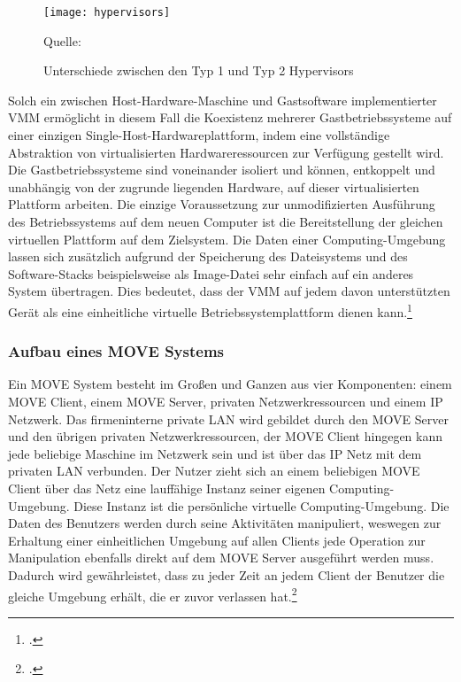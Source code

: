 \begin{figure}[H]
\begin{center}
\texttt{[image: hypervisors]}
\caption{Unterschiede zwischen den Typ 1 und Typ 2 Hypervisors}
Quelle: \cite[]{ibm}
\end{center}
\end{figure}
\vspace{-1cm}

Solch ein zwischen Host-Hardware-Maschine und Gastsoftware implementierter VMM ermöglicht in diesem Fall die Koexistenz mehrerer Gastbetriebssysteme auf einer einzigen Single-Host-Hardwareplattform, indem eine vollständige Abstraktion von virtualisierten Hardwareressourcen zur Verfügung gestellt wird. Die Gastbetriebssysteme sind voneinander isoliert und können, entkoppelt und unabhängig von der zugrunde liegenden Hardware, auf dieser virtualisierten Plattform arbeiten. Die einzige Voraussetzung zur unmodifizierten Ausführung des Betriebssystems auf dem neuen Computer ist die Bereitstellung der gleichen virtuellen Plattform auf dem Zielsystem. Die Daten einer Computing-Umgebung lassen sich zusätzlich aufgrund der Speicherung des Dateisystems und des Software-Stacks beispielsweise als Image-Datei sehr einfach auf ein anderes System übertragen. Dies bedeutet, dass der VMM auf jedem davon unterstützten Gerät als eine einheitliche virtuelle Betriebssystemplattform dienen kann.\footcite[Vgl.][Seite 891]{MOVE}

\subsubsection{Aufbau eines MOVE Systems}
Ein MOVE System besteht im Großen und Ganzen aus vier Komponenten: einem MOVE Client, einem MOVE Server, privaten Netzwerkressourcen und einem IP Netzwerk. Das firmeninterne private LAN wird gebildet durch den MOVE Server und den übrigen privaten Netzwerkressourcen, der MOVE Client hingegen kann jede beliebige Maschine im Netzwerk sein und ist über das IP Netz mit dem privaten LAN verbunden. 
Der Nutzer zieht sich an einem beliebigen MOVE Client über das Netz eine lauffähige Instanz seiner eigenen Computing-Umgebung. Diese Instanz ist die persönliche virtuelle Computing-Umgebung. Die Daten des Benutzers werden durch seine Aktivitäten manipuliert, weswegen zur Erhaltung einer einheitlichen Umgebung auf allen Clients jede Operation zur Manipulation ebenfalls direkt auf dem MOVE Server ausgeführt werden muss. Dadurch wird gewährleistet, dass zu jeder Zeit an jedem Client der Benutzer die gleiche Umgebung erhält, die er zuvor verlassen hat.\footcite[Vgl.][Seite 891 f.]{MOVE}

